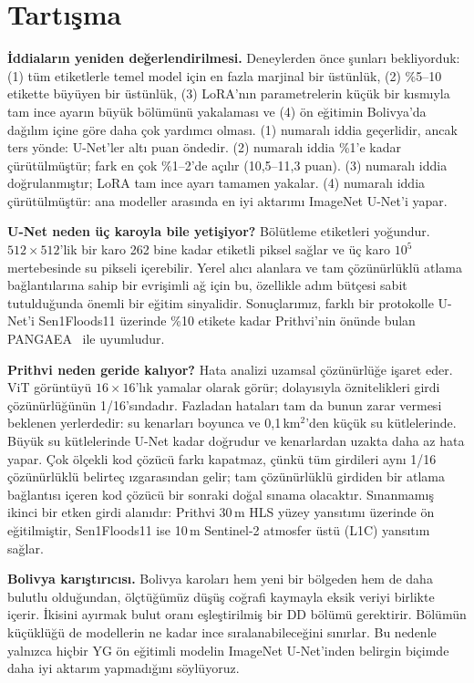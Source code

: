 \documentclass[conference]{IEEEtran}
\begin{document}
\section{Tartışma}
\label{sec:discussion}
\textbf{İddiaların yeniden değerlendirilmesi.} Deneylerden önce şunları bekliyorduk: (1) tüm etiketlerle temel model için en fazla marjinal bir üstünlük, (2) \%5--10 etikette büyüyen bir üstünlük, (3) LoRA'nın parametrelerin küçük bir kısmıyla tam ince ayarın büyük bölümünü yakalaması ve (4) ön eğitimin Bolivya'da dağılım içine göre daha çok yardımcı olması. (1) numaralı iddia geçerlidir, ancak ters yönde: U-Net'ler altı puan öndedir. (2) numaralı iddia \%1'e kadar çürütülmüştür; fark en çok \%1--2'de açılır (10,5--11,3 puan). (3) numaralı iddia doğrulanmıştır; LoRA tam ince ayarı tamamen yakalar. (4) numaralı iddia çürütülmüştür: ana modeller arasında en iyi aktarımı ImageNet U-Net'i yapar.

\textbf{U-Net neden üç karoyla bile yetişiyor?} Bölütleme etiketleri yoğundur. $512\times512$'lik bir karo 262 bine kadar etiketli piksel sağlar ve üç karo $10^5$ mertebesinde su pikseli içerebilir. Yerel alıcı alanlara ve tam çözünürlüklü atlama bağlantılarına sahip bir evrişimli ağ için bu, özellikle adım bütçesi sabit tutulduğunda önemli bir eğitim sinyalidir. Sonuçlarımız, farklı bir protokolle U-Net'i Sen1Floods11 üzerinde \%10 etikete kadar Prithvi'nin önünde bulan PANGAEA~\cite{marsocci2024pangaea} ile uyumludur.

\textbf{Prithvi neden geride kalıyor?} Hata analizi uzamsal çözünürlüğe işaret eder. ViT görüntüyü $16\times16$'lık yamalar olarak görür; dolayısıyla öznitelikleri girdi çözünürlüğünün 1/16'sındadır. Fazladan hataları tam da bunun zarar vermesi beklenen yerlerdedir: su kenarları boyunca ve 0,1\,km$^2$'den küçük su kütlelerinde. Büyük su kütlelerinde U-Net kadar doğrudur ve kenarlardan uzakta daha az hata yapar. Çok ölçekli kod çözücü farkı kapatmaz, çünkü tüm girdileri aynı 1/16 çözünürlüklü belirteç ızgarasından gelir; tam çözünürlüklü girdiden bir atlama bağlantısı içeren kod çözücü bir sonraki doğal sınama olacaktır. Sınanmamış ikinci bir etken girdi alanıdır: Prithvi 30\,m HLS yüzey yansıtımı üzerinde ön eğitilmiştir, Sen1Floods11 ise 10\,m Sentinel-2 atmosfer üstü (L1C) yansıtım sağlar.

\textbf{Bolivya karıştırıcısı.} Bolivya karoları hem yeni bir bölgeden hem de daha bulutlu olduğundan, ölçtüğümüz düşüş coğrafi kaymayla eksik veriyi birlikte içerir. İkisini ayırmak bulut oranı eşleştirilmiş bir DD bölümü gerektirir. Bölümün küçüklüğü de modellerin ne kadar ince sıralanabileceğini sınırlar. Bu nedenle yalnızca hiçbir YG ön eğitimli modelin ImageNet U-Net'inden belirgin biçimde daha iyi aktarım yapmadığını söylüyoruz.
\end{document}
